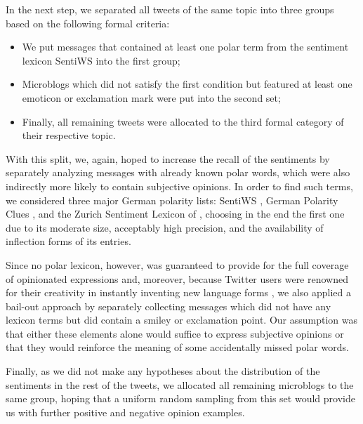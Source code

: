 In the next step, we separated all tweets of the same topic into three
groups based on the following formal criteria:
\begin{itemize}
\item We put messages that contained at least one polar term from the
  sentiment lexicon SentiWS \cite{Remus:10} into the first group;
\item Microblogs which did not satisfy the first condition but
  featured at least one emoticon or exclamation mark were put into the
  second set;
\item Finally, all remaining tweets were allocated to the third formal
  category of their respective topic.
\end{itemize}
With this split, we, again, hoped to increase the recall of the
sentiments by separately analyzing messages with already known polar
words, which were also indirectly more likely to contain subjective
opinions.  In order to find such terms, we considered three major
German polarity lists: SentiWS \cite{Remus:10}, German Polarity Clues
\cite{Waltinger:10}, and the Zurich Sentiment Lexicon of
\citet{Clematide:10}, choosing in the end the first one due to its
moderate size, acceptably high precision, and the availability of
inflection forms of its entries.

Since no polar lexicon, however, was guaranteed to provide for the
full coverage of opinionated expressions and, moreover, because
Twitter users were renowned for their creativity in instantly
inventing new language forms \cite[cf.][]{Eisenstein:13}, we also
applied a bail-out approach by separately collecting messages which
did not have any lexicon terms but did contain a smiley or exclamation
point.  Our assumption was that either these elements alone would
suffice to express subjective opinions or that they would reinforce
the meaning of some accidentally missed polar words.

Finally, as we did not make any hypotheses about the distribution of
the sentiments in the rest of the tweets, we allocated all remaining
microblogs to the same group, hoping that a uniform random sampling
from this set would provide us with further positive and negative
opinion examples.

